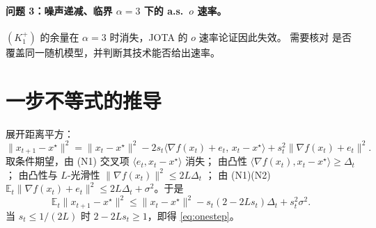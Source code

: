 \documentclass[11pt]{ctexart}
\newcommand{\E}{\mathbb{E}}
\begin{document}
\paragraph{问题 3：噪声递减、临界 $\alpha=3$ 下的 a.s.\ $o$ 速率。}
$(K_1^+)$ 的余量在 $\alpha=3$ 时消失，JOTA 的 $o$ 速率论证因此失效。
需要核对 \citet{salzo2025iterates} 是否覆盖同一随机模型，并判断其技术能否给出速率。



\appendix
\section{一步不等式的推导}\label{app:sgd}

展开距离平方：
\[
\|x_{t+1}-x^\star\|^2
=\|x_t-x^\star\|^2
-2s_t\langle\nabla f(x_t)+e_t,\,x_t-x^\star\rangle
+s_t^2\|\nabla f(x_t)+e_t\|^2 .
\]
取条件期望，由 (N1) 交叉项 $\langle e_t,x_t-x^\star\rangle$ 消失；
由凸性 $\langle\nabla f(x_t),x_t-x^\star\rangle\ge\Delta_t$；
由凸性与 $L$-光滑性 $\|\nabla f(x_t)\|^2\le2L\Delta_t$ \citep[Theorem~2.1.5]{nesterov2004}；
由 (N1)(N2) $\E_t\|\nabla f(x_t)+e_t\|^2\le2L\Delta_t+\sigma^2$。于是
\[
\E_t\|x_{t+1}-x^\star\|^2
\le\|x_t-x^\star\|^2-s_t(2-2Ls_t)\Delta_t+s_t^2\sigma^2 .
\]
当 $s_t\le1/(2L)$ 时 $2-2Ls_t\ge1$，即得 \eqref{eq:onestep}。



\end{document}
